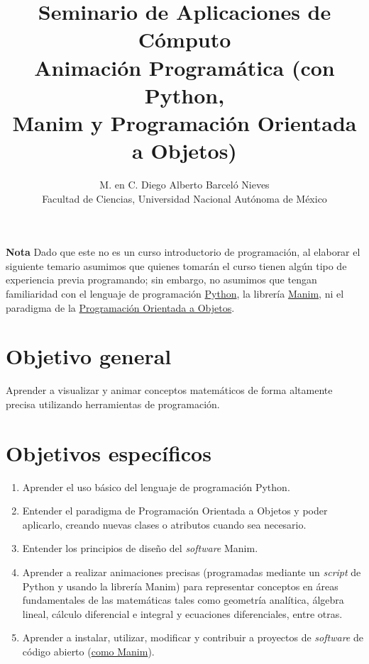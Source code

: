 \documentclass[a4paper]{article}
\begin{document}
\title{Seminario de Aplicaciones de Cómputo \\ Animación Programática (con Python, \\ Manim y Programación Orientada a Objetos) }
\author{M. en C. Diego Alberto Barceló Nieves \\ Facultad de Ciencias, Universidad Nacional Autónoma de México}
\date{}
\maketitle

\textbf{Nota} Dado que este no es un curso introductorio de programación, al elaborar el siguiente temario asumimos que quienes tomarán el curso tienen algún tipo de experiencia previa programando; sin embargo, no asumimos que tengan familiaridad con el lenguaje de programación \hyperlink{https://www.python.org/}{Python}, la librería \hyperlink{https://www.manim.community/}{Manim}, ni el paradigma de la \hyperlink{https://developer.mozilla.org/es/docs/Glossary/OOP}{Programación Orientada a Objetos}.

\section*{Objetivo general} \label{Sec: Objetivo general}

Aprender a visualizar y animar conceptos matemáticos de forma altamente precisa utilizando herramientas de programación.

\section*{Objetivos específicos} \label{Sec: Objetivos específicos}

\begin{enumerate}

    \item Aprender el uso básico del lenguaje de programación Python.

    \item Entender el paradigma de Programación Orientada a Objetos y poder aplicarlo, creando nuevas clases o atributos cuando sea necesario.

    \item Entender los principios de diseño del \emph{software} Manim.

    \item Aprender a realizar animaciones precisas (programadas mediante un \emph{script} de Python y usando la librería Manim) para representar conceptos en áreas fundamentales de las matemáticas tales como geometría analítica, álgebra lineal, cálculo diferencial e integral y ecuaciones diferenciales, entre otras.

    \item Aprender a instalar, utilizar, modificar y contribuir a proyectos de \emph{software} de código abierto (\hyperlink{https://github.com/ManimCommunity/manim}{como Manim}).
\end{enumerate}
\end{document}
